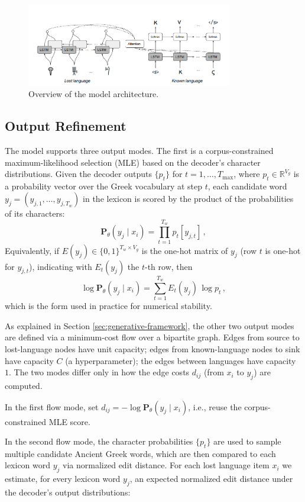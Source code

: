 \begin{figure}[H]
    \centering
    \includegraphics[width=0.8\textwidth]{Images/luo_model_overview.png} %
    \caption{Overview of the model architecture.\protect\footnotemark}
    \label{fig:luo_model_overview}
\end{figure}

\subsection{Output Refinement}
The model supports three output modes.
The first is a corpus-constrained maximum-likelihood selection (MLE) based on the decoder's character distributions.
Given the decoder outputs $\{p_t\}$ for $t=1,\ldots,T_{\max}$, where $p_t\in\mathbb{R}^{V_g}$ is a probability vector over the Greek vocabulary at step $t$, each candidate word $y_j=(y_{j, 1},\ldots,y_{j, T_w})$ in the lexicon is scored by the product of the probabilities of its characters:
\[
\mathbf{P}_{\theta}(y_j \mid x_i)
= \prod_{t=1}^{T_w} p_t[y_{j, t}] \, ,
\]
Equivalently, if $E(y_j)\in\{0,1\}^{T_w\times V_g}$ is the one-hot matrix of $y_j$ (row $t$ is one-hot for $y_{j,t}$), indicating with $E_t(y_j)$ the $t$-th row, then
\[
\log \mathbf{P}_{\theta}(y_j \mid x_i)
= \sum_{t=1}^{T_w} E_t(y_j)\,\log p_t \, ,
\]
which is the form used in practice for numerical stability.

As explained in Section \ref{sec:generative-framework}, the other two output modes are defined via a minimum-cost flow over a bipartite graph.
Edges from source to lost-language nodes have unit capacity; edges from known-language nodes to sink have capacity $C$ (a hyperparameter); the edges between languages have capacity $1$.
The two modes differ only in how the edge costs $d_{ij}$ (from $x_i$ to $y_j$) are computed.

In the first flow mode, set $d_{ij}=-\log \mathbf{P}_{\theta}(y_j\mid x_i)$, i.e., reuse the corpus-constrained MLE score.

In the second flow mode, the character probabilities $\{p_t\}$ are used to sample multiple candidate Ancient Greek words, which are then compared to each lexicon word $y_j$ via normalized edit distance.
For each lost language item $x_i$ we estimate, for every lexicon word $y_j$, an expected normalized edit distance under the decoder's output distributions:

